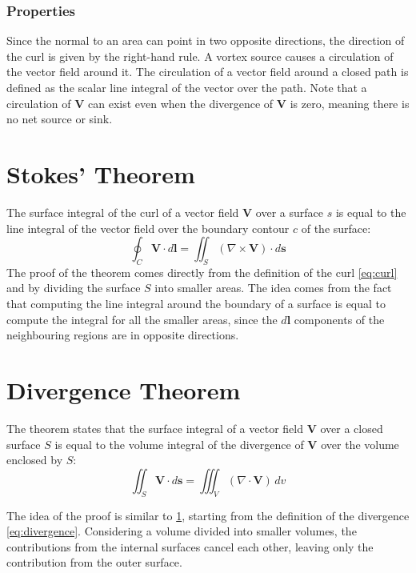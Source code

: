 \subsubsection{Properties}
Since the normal to an area can point in two opposite directions, the direction 
of the curl is given by the right-hand rule.
A vortex source causes a circulation of the vector field around it. The 
circulation of a vector field around a closed path is defined as the scalar line 
integral of the vector over the path. Note that a circulation of \(\mathbf{V}\) 
can exist even when the divergence of \(\mathbf{V}\) is zero, meaning there is no 
net source or sink.

\section{Stokes' Theorem} \label{Stokes' Theorem}
The surface integral of the curl of a vector field \(\mathbf{V}\) over a surface 
\( s \) is equal to the line integral of the vector field over the boundary 
contour \( c \) of the surface:
\begin{equation}
\oint_C \mathbf{V} \cdot d\mathbf{l} = \iint_S (\nabla \times \mathbf{V}) \cdot 
d\mathbf{s}
\label{eq:stokes}
\end{equation}
The proof of the theorem comes directly from the definition of the curl 
\ref{eq:curl} and by dividing the surface $S$ into smaller areas. The idea comes 
from the fact that computing the line integral around the boundary of a surface 
is equal to compute the integral for all the smaller areas, since the 
\(d\mathbf{l}\) components of the neighbouring regions are in opposite 
directions.

\section{Divergence Theorem}
The theorem states that the surface integral of a vector field \(\mathbf{V}\) 
over a closed surface \(S\) is equal to the volume integral of the divergence of 
\(\mathbf{V}\) over the volume enclosed by \(S\):
\begin{equation}
\iint_S\mathbf{V} \cdot d\mathbf{s} = \iiint_V (\nabla \cdot \mathbf{V}) \, dv
\label{eq:divergence_th}
\end{equation}

The idea of the proof is similar to \ref{Stokes' Theorem}, starting from the 
definition of the divergence \ref{eq:divergence}. Considering a volume divided 
into smaller volumes, the contributions from the internal surfaces cancel each 
other, leaving only the contribution from the outer surface.

